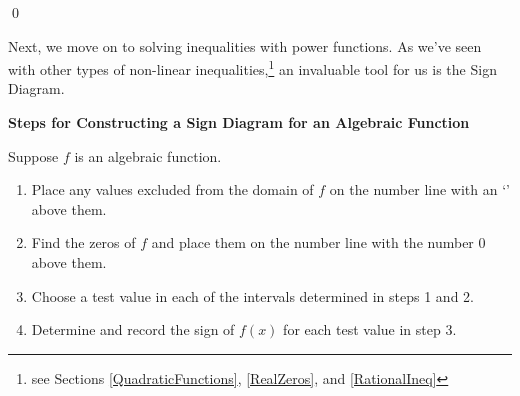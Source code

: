 \documentclass{ximera}
\begin{document}
\begin{example}
\begin{enumerate}
\begin{center}

% 




\end{center}

\end{enumerate}

\qed

\end{example}

Next, we move on to solving inequalities with power functions.  As we've seen with other types of non-linear inequalities,\footnote{see Sections \ref{QuadraticFunctions}, \ref{RealZeros}, and \ref{RationalIneq}} an invaluable tool for us is the Sign Diagram.

\label{algebraicsigndiagram}


\centerline{\textbf{Steps for Constructing a Sign Diagram for an Algebraic Function}} 

\medskip

\hspace{.17in} Suppose $f$ is an algebraic function. 

\begin{enumerate}

\item  Place any values excluded from the domain of  $f$ on the number line with an `\textinterrobang' above them.

\item  Find the zeros of $f$ and place them on the number line with the number $0$ above them.

\item  Choose a test value in each of the intervals determined in steps 1 and 2.

\item  Determine and record the sign of $f(x)$ for each test value in step 3.

\end{enumerate}
\end{document}
